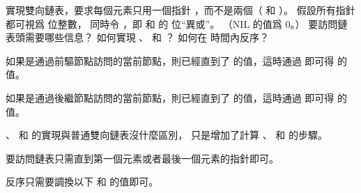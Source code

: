 \startEXERCISE\DIFFICULT
實現雙向鏈表，要求每個元素只用一個指針 ，而不是兩個（ 和 ）。
假設所有指針都可視爲  位整數，
同時令 ，即  和  的  位“異或”。
（NIL 的值爲 0。）
要訪問鏈表頭需要哪些信息？
如何實現 、  和 ？
如何在  時間內反序？
\stopEXERCISE

\startANSWER
如果是通過前驅節點訪問的當前節點，則已經直到了  的值，這時通過  即可得  的值。

如果是通過後繼節點訪問的當前節點，則已經直到了  的值，這時通過  即可得  的值。

、  和  的實現與普通雙向鏈表沒什麼區別，
只是增加了計算 、  和  的步驟。

要訪問鏈表只需直到第一個元素或者最後一個元素的指針即可。

反序只需要調換以下  和  的值即可。
\stopANSWER

\stopsection
